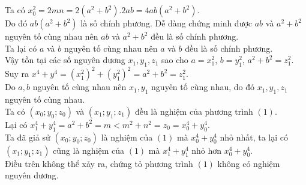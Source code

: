 \begin{bt}
{	Ta có $x_0^2=2mn=2(a^2+b^2).2ab=4ab(a^2+b^2)$.\\
	Do đó $ab(a^2+b^2)$ là số chính phương. Dễ dàng chứng minh được $ab$ và $a^2+b^2$ nguyên tố cùng nhau nên $ab$ và $a^2+b^2$ đều là số chính phương.\\
	Ta lại có $a$ và $b$ nguyên tố cùng nhau nên $a$ và $b$ đều là số chính phương.\\
	Vậy tồn tại các số nguyên dương $x_1,y_1,z_1$ sao cho $a=x_1^2$, $b=y_1^2$, $a^2+b^2=z_1^2$.\\
	Suy ra $x^4+y^4=(x_1^2)^2+(y_1^2)^2=a^2+b^2=z_1^2$.\\
	Do $a,b$ nguyên tố cùng nhau nên $x_1,y_1$ nguyên tố cùng nhau, do đó $x_1,y_1,z_1$ nguyên tố cùng nhau.\\
	Ta có $(x_0;y_0;z_0)$ và $(x_1;y_1;z_1)$ đều là nghiệm của phương trình $(1)$.\\
	Lại có $x_1^4+y_1^4=a^2+b^2=m<m^2+n^2=z_0=x_0^4+y_0^4$.\\
	Ta đã giả sử $(x_0;y_0;z_0)$ là nghiệm của $(1)$ mà $x_0^4+y_0^4$ nhỏ nhất, ta lại có $(x_1;y_1;z_1)$ cũng là nghiệm của $(1)$ mà $x_1^4+y_1^4$ nhỏ hơn $x_0^4+y_0^4$.\\
	Điều trên không thể xảy ra, chứng tỏ phương trình $(1)$ không có nghiệm nguyên dương.
	}
\end{bt}
   